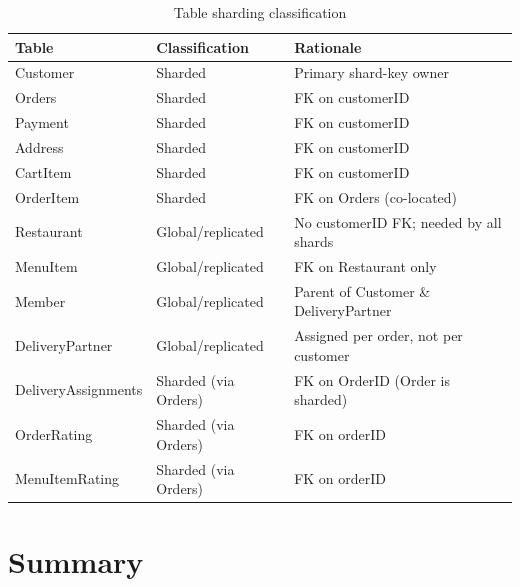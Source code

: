 \documentclass[12pt, a4paper]{article}
\renewcommand{\_}{\plainunderscore\allowbreak}
\begin{document}
\begin{table}[h!]
\centering
\caption{Table sharding classification}
\label{tab:classification}
\begin{tabular}{@{} L{4.0cm} C{2.6cm} L{5.8cm} @{}}
\toprule
\textbf{Table} & \textbf{Classification} & \textbf{Rationale} \\
\midrule
Customer         & Sharded    & Primary shard-key owner \\
Orders           & Sharded    & FK on customerID \\
Payment          & Sharded    & FK on customerID \\
Address          & Sharded    & FK on customerID \\
CartItem         & Sharded    & FK on customerID \\
OrderItem        & Sharded    & FK on Orders (co-located) \\
\midrule
Restaurant       & Global/replicated & No customerID FK; needed by all shards \\
MenuItem         & Global/replicated & FK on Restaurant only \\
Member           & Global/replicated & Parent of Customer \& DeliveryPartner \\
DeliveryPartner  & Global/replicated & Assigned per order, not per customer \\
Delivery\_Assignments & Sharded (via Orders) & FK on OrderID (Order is sharded) \\
OrderRating      & Sharded (via Orders) & FK on orderID \\
MenuItemRating   & Sharded (via Orders) & FK on orderID \\
\bottomrule
\end{tabular}
\end{table}

\section{Summary}
\end{document}
